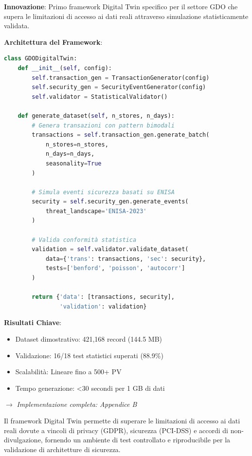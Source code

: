 \begin{tcolorbox}[title={Innovation Box 1.4: Framework Digital Twin GDO-Bench}, colback=blue!5, colframe=blue!75!black,breakable]

\textbf{Innovazione}: Primo framework Digital Twin specifico per il settore GDO che supera le limitazioni di accesso ai dati reali attraverso simulazione statisticamente validata.

\textbf{Architettura del Framework}:
\begin{lstlisting}[language=Python, basicstyle=\small\ttfamily]
class GDODigitalTwin:
    def __init__(self, config):
        self.transaction_gen = TransactionGenerator(config)
        self.security_gen = SecurityEventGenerator(config)
        self.validator = StatisticalValidator()
    
    def generate_dataset(self, n_stores, n_days):
        # Genera transazioni con pattern bimodali
        transactions = self.transaction_gen.generate_batch(
            n_stores=n_stores,
            n_days=n_days,
            seasonality=True
        )
        
        # Simula eventi sicurezza basati su ENISA
        security = self.security_gen.generate_events(
            threat_landscape='ENISA-2023'
        )
        
        # Valida conformità statistica
        validation = self.validator.validate_dataset(
            data={'trans': transactions, 'sec': security},
            tests=['benford', 'poisson', 'autocorr']
        )
        
        return {'data': [transactions, security], 
                'validation': validation}
\end{lstlisting}

\textbf{Risultati Chiave}:
\begin{itemize}
\item Dataset dimostrativo: 421,168 record (144.5 MB)
\item Validazione: 16/18 test statistici superati (88.9\%)
\item Scalabilità: Lineare fino a 500+ PV
\item Tempo generazione: <30 secondi per 1 GB di dati
\end{itemize}


$\rightarrow$ \textit{Implementazione completa: Appendice B}
\end{tcolorbox}

Il framework Digital Twin permette di superare le limitazioni di accesso ai dati reali dovute a vincoli di privacy (GDPR), sicurezza (PCI-DSS) e accordi di non-divulgazione, fornendo un ambiente di test controllato e riproducibile per la validazione di architetture di sicurezza.

